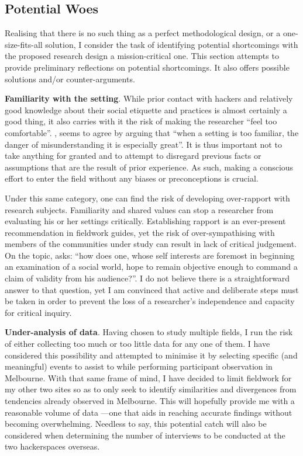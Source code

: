 \subsection{Potential Woes}

Realising that there is no such thing as a perfect methodological design, or a one-size-fits-all solution, I consider the task of identifying potential shortcomings with the proposed research design a mission-critical one. This section attempts to provide preliminary reflections on potential shortcomings. It also offers possible solutions and/or counter-arguments.

\begin{list}{}{\leftmargin=0em}

\item[] \textbf{Familiarity with the setting}. While prior contact with hackers and relatively good knowledge about their social etiquette and practices is almost certainly a good thing, it also carries with it the risk of making the researcher ``feel too comfortable''. \citet{hammersley90}, seems to agree by arguing that ``when a setting is too familiar, the danger of misunderstanding it is especially great''. It is thus important not to take anything for granted and to attempt to disregard previous facts or assumptions that are the result of prior experience. As such, making a conscious effort to enter the field without any biases or preconceptions is crucial.

Under this same category, one can find the risk of developing over-rapport with research subjects. Familiarity and shared values can stop a researcher from evaluating his or her settings critically. Establishing rapport is an ever-present recommendation in fieldwork guides, yet the risk of over-sympathising with members of the communities under study can result in lack of critical judgement. On the topic, \citet{roberts94} asks: ``how does one, whose self interests are foremost in beginning an examination of a social world, hope to remain objective enough to command a claim of validity from his audience?''. I do not believe there is a straightforward answer to that question, yet I am convinced that active and deliberate steps must be taken in order to prevent the loss of a researcher's independence and capacity for critical inquiry.

\item[] \textbf{Under-analysis of data}. Having chosen to study multiple fields, I run the risk of either collecting too much or too little data for any one of them. I have considered this possibility and attempted to minimise it by selecting specific (and meaningful) events to assist to while performing participant observation in Melbourne. With that same frame of mind, I have decided to limit fieldwork for my other two sites so as to only seek to identify similarities and divergences from tendencies already observed in Melbourne. This will hopefully provide me with a reasonable volume of data ---one that aids in reaching accurate findings without becoming overwhelming. Needless to say, this potential catch will also be considered when determining the number of interviews to be conducted at the two hackerspaces overseas.


\end{list}
